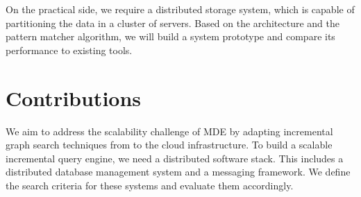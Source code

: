 On the practical side, we require a distributed storage system, which is capable of partitioning the data in a cluster of servers. Based on the architecture and the pattern matcher algorithm, we will build a system prototype and compare its performance to existing tools.





\section{Contributions}

We aim to address the scalability challenge of MDE by adapting incremental graph search techniques from \eiq{} to the cloud infrastructure. To build a scalable incremental query engine, we need a distributed software stack. This includes a distributed database management system and a messaging framework. We define the search criteria for these systems and evaluate them accordingly.

